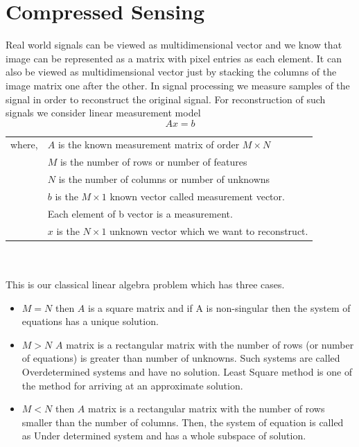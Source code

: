 \section{Compressed Sensing}
\label{s:introduction_cs}

Real world signals can be viewed as multidimensional vector and we know that image can be represented as
a matrix with pixel entries as each element. It can also be viewed as multidimensional vector
just by stacking the columns of the image matrix one after the other. In signal processing we measure
samples of the signal in order to reconstruct the original signal. For reconstruction of such signals we
consider linear measurement model
\begin{equation}
Ax = b
\label{1.1}
\end{equation}

\begin{tabular}{ll}
 where,& $A$ is the known measurement matrix of order $M \times N$ \\
      & $M$ is the number of rows or number of features \\
      & $N$ is the number of columns or number of unknowns \\
      & $b$ is the $M \times 1$ known vector called measurement vector. \\
      & \hspace{6mm} Each element of b vector is a measurement.\\ 
      & $x$ is the $N \times 1$ unknown vector which we want to reconstruct.\\
\end{tabular}
\\ \\This is our classical linear algebra problem which has three cases. 
\begin{itemize}
\item $M=N$ then $A$ is a square matrix and if A is non-singular then the system of equations has a
unique solution.

\item $M>N$ $A$ matrix is a rectangular matrix with the number of rows (or number of equations) is greater
than number of unknowns. Such systems are called Overdetermined systems and have no solution. Least Square 
method is one of the method for arriving at an approximate solution.

\item $M<N$ then $A$ matrix is a rectangular matrix with the number of rows smaller than the number of columns.
Then, the system of equation is called as Under determined system and has a whole subspace of solution.
\end{itemize}

